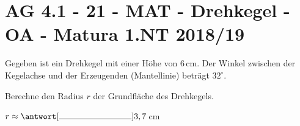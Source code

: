 \section{AG 4.1 - 21 - MAT - Drehkegel - OA - Matura 1.NT 2018/19}

\begin{beispiel}[AG 4.1]{1}
Gegeben ist ein Drehkegel mit einer Höhe von 6\,cm. Der Winkel zwischen der Kegelachse und der Erzeugenden (Mantellinie) beträgt $32^\circ$.

Berechne den Radius $r$ der Grundfläche des Drehkegels.\leer

$r\approx\antwort[\rule{3cm}{0.3pt}]{3,7}$\,cm

\end{beispiel}